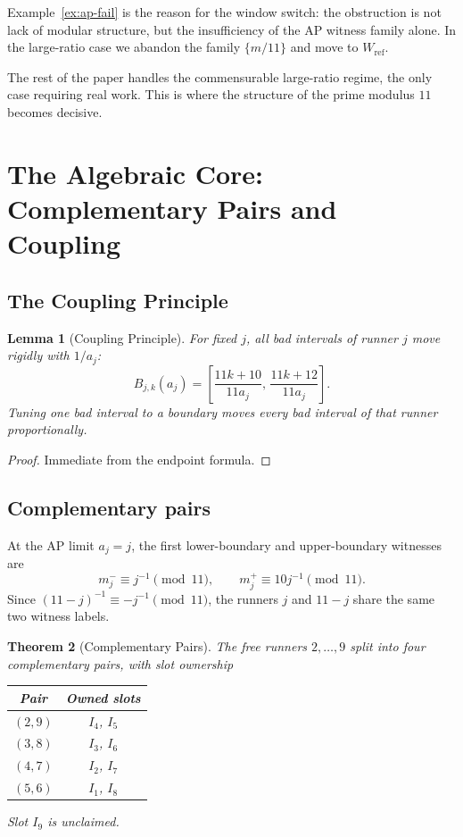 \documentclass[12pt,a4paper]{amsart}
\newtheorem{theorem}{Theorem}[section]
\newtheorem{lemma}[theorem]{Lemma}
\theoremstyle{definition}
\theoremstyle{remark}
\newcommand{\Wref}{W_{\mathrm{ref}}}
\begin{document}
Example~\ref{ex:ap-fail} is the reason for the window switch: the obstruction is not lack
of modular structure, but the insufficiency of the AP witness family alone. In the large-ratio
case we abandon the family $\{m/11\}$ and move to $\Wref$.

The rest of the paper handles the commensurable large-ratio regime, the only case requiring
real work. This is where the structure of the prime modulus $11$ becomes decisive.

\section{The Algebraic Core: Complementary Pairs and Coupling}

\subsection{The Coupling Principle}

\begin{lemma}[Coupling Principle]\label{lem:coupling}
For fixed $j$, all bad intervals of runner $j$ move rigidly with $1/a_j$:
\[
  B_{j,k}(a_j) = \left[\frac{11k+10}{11a_j},\,\frac{11k+12}{11a_j}\right].
\]
Tuning one bad interval to a boundary moves every bad interval of that runner proportionally.
\end{lemma}

\begin{proof}
Immediate from the endpoint formula.
\end{proof}

\subsection{Complementary pairs}

At the AP limit $a_j=j$, the first lower-boundary and upper-boundary witnesses are
\[
  m_j^- \equiv j^{-1}\pmod{11},\qquad m_j^+ \equiv 10j^{-1}\pmod{11}.
\]
Since $(11-j)^{-1}\equiv -j^{-1}\pmod{11}$, the runners $j$ and $11-j$ share the same two
witness labels.

\begin{theorem}[Complementary Pairs]\label{thm:comp-pairs}
The free runners $2,\ldots,9$ split into four complementary pairs, with slot ownership

\medskip
\begin{center}
\begin{tabular}{cc}
\toprule
Pair & Owned slots \\
\midrule
$(2,9)$ & $I_4$, $I_5$ \\
$(3,8)$ & $I_3$, $I_6$ \\
$(4,7)$ & $I_2$, $I_7$ \\
$(5,6)$ & $I_1$, $I_8$ \\
\bottomrule
\end{tabular}
\end{center}

\medskip\noindent
Slot $I_9$ is unclaimed.
\end{theorem}
\end{document}
